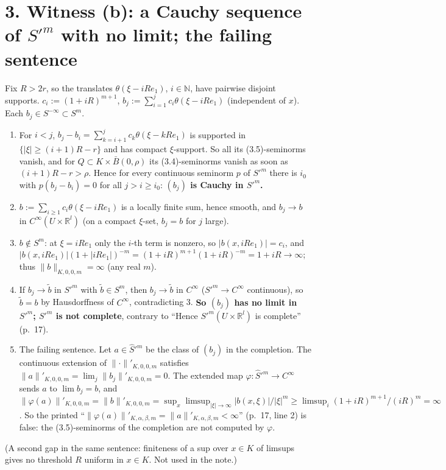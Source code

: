 \documentclass[11pt]{article}
\newcommand{\R}{\mathbb{R}}
\newcommand{\N}{\mathbb{N}}
\begin{document}
\section*{3. Witness (b): a Cauchy sequence of $S'^m$ with no limit; the failing sentence}
Fix $R>2r$, so the translates $\theta(\xi-iRe_1)$, $i\in\N$, have pairwise disjoint supports. $c_i:=(1+iR)^{m+1}$, $b_j:=\sum_{i=1}^jc_i\theta(\xi-iRe_1)$ (independent of $x$). Each $b_j\in S^{-\infty}\subset S^m$.
\begin{enumerate}
\item For $i<j$, $b_j-b_i=\sum_{k=i+1}^jc_k\theta(\xi-kRe_1)$ is supported in $\{|\xi|\ge(i+1)R-r\}$ and has compact $\xi$-support. So all its (3.5)-seminorms vanish, and for $Q\subset K\times\bar B(0,\rho)$ its (3.4)-seminorms vanish as soon as $(i+1)R-r>\rho$. Hence for every continuous seminorm $p$ of $S'^m$ there is $i_0$ with $p(b_j-b_i)=0$ for all $j>i\ge i_0$: \textbf{$(b_j)$ is Cauchy in $S'^m$.}
\item $b:=\sum_{i\ge1}c_i\theta(\xi-iRe_1)$ is a locally finite sum, hence smooth, and $b_j\to b$ in $C^\infty(U\times\R^l)$ (on a compact $\xi$-set, $b_j=b$ for $j$ large).
\item $b\notin S^m$: at $\xi=iRe_1$ only the $i$-th term is nonzero, so $|b(x,iRe_1)|=c_i$, and $|b(x,iRe_1)|(1+|iRe_1|)^{-m}=(1+iR)^{m+1}(1+iR)^{-m}=1+iR\to\infty$; thus $\|b\|_{K,0,0,m}=\infty$ (any real $m$).
\item If $b_j\to\tilde b$ in $S'^m$ with $\tilde b\in S^m$, then $b_j\to\tilde b$ in $C^\infty$ ($S'^m\to C^\infty$ continuous), so $\tilde b=b$ by Hausdorffness of $C^\infty$, contradicting 3. \textbf{So $(b_j)$ has no limit in $S'^m$; $S'^m$ is not complete}, contrary to ``Hence $S'^m(U\times\R^l)$ is complete'' (p.~17).
\item The failing sentence. Let $a\in\hat S'^m$ be the class of $(b_j)$ in the completion. The continuous extension of $\|\cdot\|'_{K,0,0,m}$ satisfies $\|a\|'_{K,0,0,m}=\lim_j\|b_j\|'_{K,0,0,m}=0$. The extended map $\varphi\colon\hat S'^m\to C^\infty$ sends $a$ to $\lim b_j=b$, and $\|\varphi(a)\|'_{K,0,0,m}=\|b\|'_{K,0,0,m}=\sup_x\limsup_{|\xi|\to\infty}|b(x,\xi)|/|\xi|^m\ge\limsup_i(1+iR)^{m+1}/(iR)^m=\infty$. So the printed ``$\|\varphi(a)\|'_{K,\alpha,\beta,m}=\|a\|'_{K,\alpha,\beta,m}<\infty$'' (p.~17, line 2) is false: the (3.5)-seminorms of the completion are not computed by $\varphi$.
\end{enumerate}
(A second gap in the same sentence: finiteness of a sup over $x\in K$ of limsups gives no threshold $R$ uniform in $x\in K$. Not used in the note.)
\end{document}
